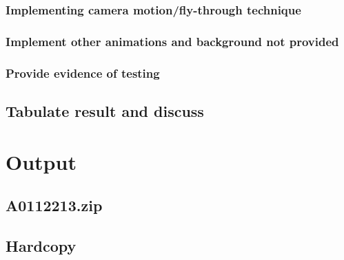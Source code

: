 \documentclass[11pt]{article}
\begin{document}
\subsubsection{Implementing camera motion/fly-through technique}
\label{sec:orgb96485d}

\subsubsection{Implement other animations and background not provided}
\label{sec:orgecf4738}

\subsubsection{Provide evidence of testing}
\label{sec:orgdcf4fdd}

\subsection{Tabulate result and discuss}
\label{sec:orga6ba8f7}

\section{Output}
\label{sec:org505f72f}
\subsection{A0112213.zip}
\label{sec:orge2b7a2b}

\subsection{Hardcopy}
\label{sec:org342f206}
\end{document}
